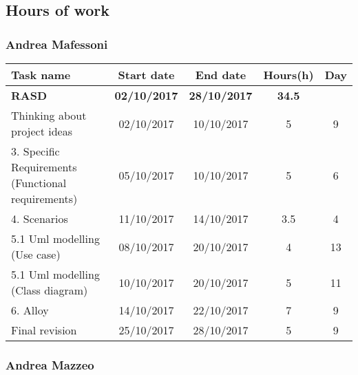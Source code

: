 \subsection{Hours of work}
\subsubsection{Andrea Mafessoni}

\begin{table}[h!]
	\begin{tabular}{lcccc}
		\toprule
		\textbf{Task name} & \textbf{Start date} & \textbf{End date} & \textbf{Hours(h)} & \textbf{Day} \\
		\midrule
		\textbf{RASD} & \textbf{02/10/2017} & \textbf{28/10/2017} & \textbf{34.5} &  \\
		Thinking about project ideas & 02/10/2017 & 10/10/2017 & 5 & 9 \\
		3. Specific Requirements (Functional requirements) & 05/10/2017 & 10/10/2017 & 5 & 6 \\
		4. Scenarios & 11/10/2017 & 14/10/2017 & 3.5 & 4 \\
		5.1 Uml modelling (Use case) & 08/10/2017 & 20/10/2017 & 4 & 13 \\
		5.1 Uml modelling (Class diagram) & 10/10/2017 & 20/10/2017 & 5 & 11 \\
		6. Alloy & 14/10/2017 & 22/10/2017 & 7 & 9 \\
		\bottomrule
		Final revision & 25/10/2017 & 28/10/2017 & 5 & 9 \\
	\end{tabular}
\end{table}

\subsubsection{Andrea Mazzeo}

